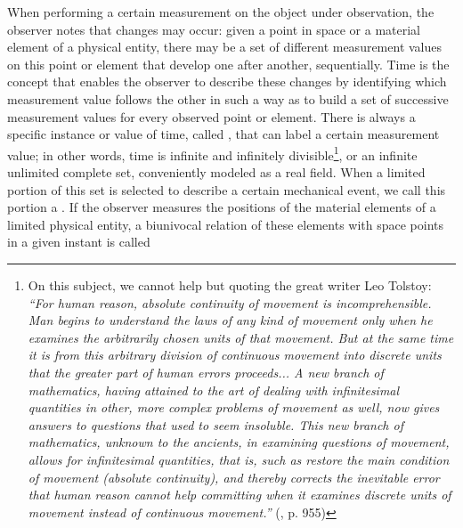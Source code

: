 When performing a certain measurement on the object under observation, the observer notes that changes may occur: given a point in space or a material element of a physical entity, there may be a set of different measurement values on this point or element that develop one after another, sequentially. Time is the concept that enables the observer to describe these changes by identifying which measurement value follows the other in such a way as to build a set of successive measurement values for every observed point or element.  There is always a specific instance or value of time, called , that can label a certain measurement value; in other words, time is infinite and infinitely divisible\footnote{On this subject, we cannot help but quoting the great writer Leo Tolstoy: \textit{``For human reason, absolute continuity of movement is incomprehensible. Man begins to understand the laws of any kind of movement only when he examines the arbitrarily chosen units of that movement. But at the same time it is from this arbitrary division of continuous movement into discrete units that the greater part of human errors proceeds... A new branch of mathematics, having attained to the art of dealing with infinitesimal quantities in other, more complex problems of movement as well, now gives answers to questions that used to seem insoluble. This new branch of mathematics, unknown to the ancients, in examining questions of movement, allows for infinitesimal quantities, that is, such as restore the main condition of movement (absolute continuity), and thereby corrects the inevitable error that human reason cannot help committing when it examines discrete units of movement instead of continuous movement.''} (\cite{tolstoi_2014_1}, p. 955)}, or an infinite unlimited complete set, conveniently modeled as a real field. When a limited portion of this set is selected to describe a certain mechanical event, we call this portion a . If the observer measures the positions of the material elements of a limited physical entity, a biunivocal relation of these elements with space points in a given instant is called
